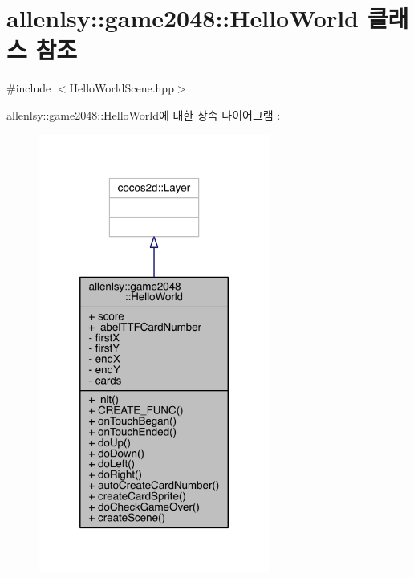 \hypertarget{classallenlsy_1_1game2048_1_1_hello_world}{}\section{allenlsy\+:\+:game2048\+:\+:Hello\+World 클래스 참조}
\label{classallenlsy_1_1game2048_1_1_hello_world}


{\ttfamily \#include $<$Hello\+World\+Scene.\+hpp$>$}



allenlsy\+:\+:game2048\+:\+:Hello\+World에 대한 상속 다이어그램 \+: 
\nopagebreak
\begin{figure}[H]
\begin{center}
\leavevmode
\includegraphics[width=216pt]{df/d57/classallenlsy_1_1game2048_1_1_hello_world__inherit__graph}
\end{center}
\end{figure}


